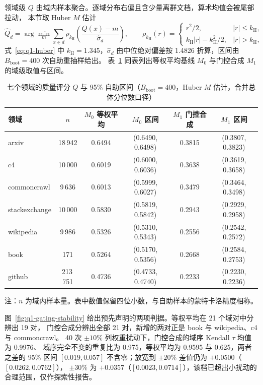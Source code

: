 领域级 $Q$ 由域内样本聚合。逐域分布右偏且含少量离群文档，算术均值会被尾部拉动，
本节取 Huber $M$ 估计
\begin{equation}
  \hat Q_d=\arg\min_{m}\sum_{x\in d}\rho_{k_{\mathrm{H}}}\!\left(\frac{Q(x)-m}{\hat\sigma_d}\right),
  \qquad
  \rho_{k_{\mathrm{H}}}(r)=
  \begin{cases}
    r^{2}/2, & |r|\le k_{\mathrm{H}},\\
    k_{\mathrm{H}}|r|-k_{\mathrm{H}}^{2}/2, & |r|>k_{\mathrm{H}},
  \end{cases}
  \label{eq:q1-huber}
\end{equation}
式~\eqref{eq:q1-huber} 中 $k_{\mathrm{H}}=1.345$，$\hat\sigma_d$ 由中位绝对偏差按 1.4826 折算，区间由 $B_{\mathrm{boot}}=400$ 次自助重抽样给出。
表~\ref{tab:q1-domain-quality} 同表列出等权平均基线 $M_0$ 与门控合成 $M_1$ 的域级取值与区间。

\begin{table}[H]
  \centering
  \caption{七个领域的质量评分 $Q$ 与 95\% 自助区间（$B_{\mathrm{boot}}=400$，Huber $M$ 估计，合并总体分位数口径）}
  \label{tab:q1-domain-quality}
  \begin{tabular}{@{}lccccc@{}}
    \toprule
    领域 & $n$ & $M_0$ 等权平均 & $M_0$ 区间 & $M_1$ 门控合成 & $M_1$ 区间 \\
    \midrule
    arxiv        & 18\,942  & 0.6494 & (0.6490, 0.6498) & 0.3815 & (0.3807, 0.3823) \\
    c4           & 10\,000  & 0.6019 & (0.6000, 0.6036) & 0.3638 & (0.3619, 0.3658) \\
    commoncrawl  & 9\,636   & 0.6013 & (0.5999, 0.6027) & 0.3479 & (0.3464, 0.3498) \\
    stackexchange & 10\,000 & 0.5830 & (0.5819, 0.5842) & 0.2943 & (0.2929, 0.2958) \\
    wikipedia    & 9\,986   & 0.5326 & (0.5310, 0.5343) & 0.2556 & (0.2542, 0.2572) \\
    book         & 171      & 0.5264 & (0.5170, 0.5356) & 0.2668 & (0.2584, 0.2753) \\
    github       & 213\,751 & 0.4736 & (0.4733, 0.4740) & 0.2233 & (0.2230, 0.2236) \\
    \bottomrule
  \end{tabular}
\par\smallskip
  {\small\raggedright 注：$n$ 为域内样本量。表中数值保留四位小数，与自助样本的蒙特卡洛精度相称。\par}
\end{table}

图~\ref{fig:q1-gating-stability} 给出预先声明的两项判据。等权平均在 21 个域对中分辨出 19 对，
门控合成分辨出全部 21 对，新增的两对正是 book 与 wikipedia、c4 与 commoncrawl。
40 次 $\pm10\%$ 列权重扰动下，门控合成的域序 Kendall $\tau$ 均值为 0.9976、
域序完全不变的重复比为 0.975，等权平均为 0.9595 与 0.625，两者之差的 95\% 区间
$[0.019,0.057]$ 不含零；放宽到 $\pm20\%$ 差值仍为 $+0.0500$（$[0.0262,0.0762]$），
$\pm30\%$ 为 $+0.0357$（$[0.0023,0.0714]$），该档已超出小扰动的合理范围，仅作探索性报告。

